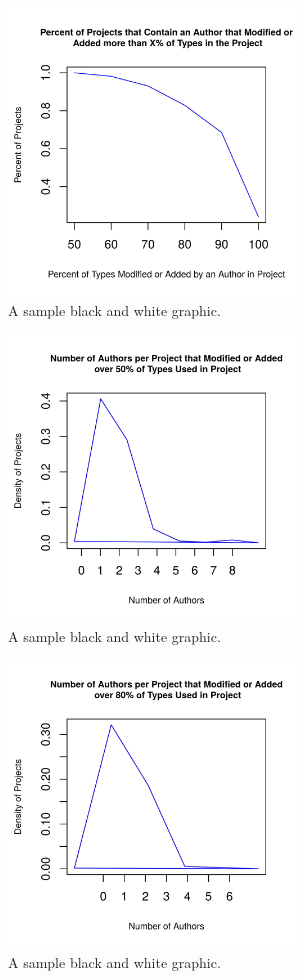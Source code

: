 \documentclass{sig-alternate-05-2015}
\begin{document}
\begin{figure}[t]
\centering
\includegraphics[height=3in, width=3in]{../lib_stats_count_authors_percent_per_project}
\caption{A sample black and white graphic.}
\label{lib_stats_count_authors_percent_per_project}
\end{figure}


\begin{figure}[t]
\centering
\includegraphics[height=3in, width=3in]{../lib_stats_Threshold50_dist}
\caption{A sample black and white graphic.}
\label{lib_stats_Threshold50_dist}
\end{figure}

\begin{figure}[t]
\centering
\includegraphics[height=3in, width=3in]{../lib_stats_Threshold80_dist}
\caption{A sample black and white graphic.}
\label{lib_stats_Threshold80_dist}
\end{figure}
\end{document}
